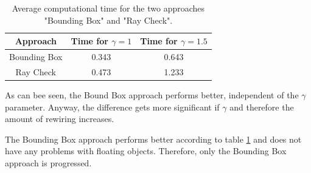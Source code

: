 \begin{table}[H] 
\begin{center}
    \begin{tabular}{ | c | c | c |}
    \hline
    Approach &  Time for $\gamma = 1$ &  Time for $\gamma = 1.5$ \\ \hline
    Bounding Box & 0.343  & 0.643  \\ \hline
    Ray Check & 0.473 & 1.233 \\
    \hline
    \end{tabular}
\caption{Average computational time for the two approaches "Bounding Box" and "Ray Check".}
    \label{tab:RayCheck}
\end{center}
\end{table}

As can bee seen, the Bound Box approach performs better, independent of the $\gamma$ parameter. Anyway, the difference gets more significant if $\gamma$ and therefore the amount of rewiring increases.\newline

The Bounding Box approach performs better according to table \ref{tab:RayCheck} and does not have any problems with floating objects. Therefore, only the Bounding Box approach is progressed. 








%
%
%
%
%

